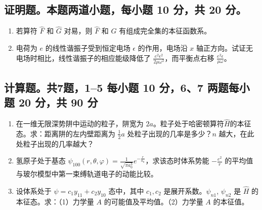 \subsection{证明题。本题两道小题，每小题 10 分，共 20 分。}
\begin{enumerate}
    \item 若算符 $\hat{F}$ 和 $\hat{G}$ 对易，则 $\hat{F}$ 和 $\hat{G}$ 有组成完全集的本征函数系。
    \item 电荷为 $e$ 的线性谐振子受到恒定电场 $\epsilon$ 的作用，电场沿 $x$ 轴正方向。试证无电场时相比，线性谐振子的相应能级降低了 $\frac{e^2 \epsilon^2}{2\mu \omega^2}$，而平衡点右移 $\frac{e^2 \epsilon}{\mu \omega}$。
\end{enumerate}
\subsection{计算题。共7题，1--5 每小题 10 分，6、7 两题每小题 20 分，共 90 分}
\begin{enumerate}
    \item 在一维无限深势阱中运动的粒子，阱宽为 $2a$。粒子处于哈密顿算符$\hat H$的本征态。求：距离阱的左内壁距离为 $\frac{1}{2}a$ 处粒子出现的几率是多少？$n$ 越大，在此处粒子出现的几率越大？
    \item 氢原子处于基态 $\psi_{100} (r, \theta, \varphi) = \frac{1}{\sqrt{\pi a_0^3}} e^{- \frac{r}{a_0}}$，求该态时体系势能 $-\frac{e^2}{r}$ 的平均值与玻尔模型中第一束缚轨道电子的动能比较。
    \item 设体系处于 $\psi = c_1 y_{11} + c_2 y_{10}$ 态中，其中 $c_1, c_2$ 是展开系数。$\psi_{n1}$, $\psi_{n2}$ 是 $\hat{H}$ 的本征态。求：（1）力学量 $A$ 的可能值及平均值。（2）力学量 $A$ 的本征值。
\end{enumerate}